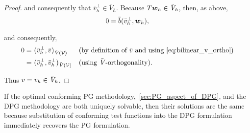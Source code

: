 \begin{proof}
and consequently that $\bar{v}_h^{\bot} \in \bar{V}_h$. Because $T\mathit{\bm{{w}}}_h \in \tilde{\mathit{{{V}}}}_h$, then, as above,
\begin{align} \label{eq:bilinear_v_ortho}
0 = \bar{b}(\bar{v}_h^{\bot},\mathit{\bm{{w}}}_h),
\end{align}

and consequently,
\begin{align}
0
=\ &
(\bar{v}_h^{\bot},\bar{v})_{\tilde{\mathit{{{V}}}}(\mathcal{{{V}}})} && (\text{by definition of $\bar{v}$ and
using}~\eqref{eq:bilinear_v_ortho}) \nonumber \\
=\ &
(\bar{v}_h^{\bot},\bar{v}_h^{\bot})_{\tilde{\mathit{{{V}}}}(\mathcal{{{V}}})} && (\text{using}\ \tilde{\mathit{{{V}}}}\text{-orthogonality}). \nonumber
\end{align}

Thus $\bar{v} = \bar{v}_h \in \tilde{\mathit{{{V}}}}_h$.

\end{proof}

If the optimal conforming PG methodology,~\autoref{sec:PG_aspect_of_DPG}, and the DPG methodology are both uniquely
solvable, then their solutions are the same because substitution of conforming test functions into the DPG formulation
immediately recovers the PG formulation.
